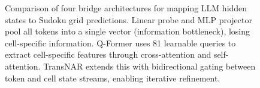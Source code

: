 \begin{figure}[t]
{\begin{tikzpicture}
\end{tikzpicture}%
}
\caption{Comparison of four bridge architectures for mapping LLM hidden states to Sudoku grid predictions. Linear probe and MLP projector pool all tokens into a single vector (information bottleneck), losing cell-specific information. Q-Former uses 81 learnable queries to extract cell-specific features through cross-attention and self-attention. TransNAR extends this with bidirectional gating between token and cell state streams, enabling iterative refinement.}
\label{fig:bridge_architectures}
\end{figure}
